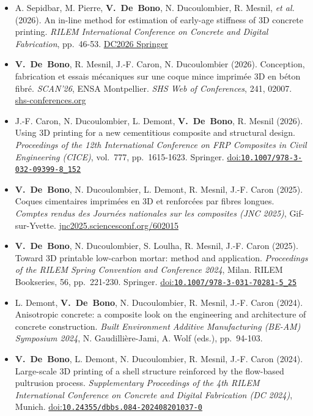 \documentclass[11pt,a4paper]{article}
\newcommand{\doi}[1]{\href{https://doi.org/#1}{doi:\nolinkurl{#1}}}
\newcommand{\me}{\textbf{V.~De~Bono}}
\newenvironment{publis}[1]%
  {\begin{itemize}[label={}, leftmargin=1.2em, labelwidth=0pt, labelsep=0pt,
     itemindent=-1.2em, itemsep=0.45em, topsep=0.3em]}%
  {\end{itemize}}
\begin{document}
\begin{publis}{C}
  \item A. Sepidbar, M. Pierre, \me, N. Ducoulombier, R. Mesnil, \emph{et al.} (2026).
  An in-line method for estimation of early-age stiffness of 3D concrete printing.
  \emph{RILEM International Conference on Concrete and Digital Fabrication}, pp.~46-53.
  \href{https://link.springer.com/chapter/10.1007/978-3-032-36738-9_6}{DC2026 Springer}

  \item \me, R. Mesnil, J.-F. Caron, N. Ducoulombier (2026).
  Conception, fabrication et essais mécaniques sur une coque mince imprimée 3D en béton fibré.
  \emph{SCAN'26}, ENSA Montpellier. \emph{SHS Web of Conferences}, 241, 02007.
  \href{https://www.shs-conferences.org/articles/shsconf/abs/2026/15/shsconf_scan26_02007/shsconf_scan26_02007.html}{shs-conferences.org}

  \item J.-F. Caron, N. Ducoulombier, L. Demont, \me, R. Mesnil (2026).
  Using 3D printing for a new cementitious composite and structural design.
  \emph{Proceedings of the 12th International Conference on FRP Composites in Civil Engineering (CICE)}, vol.~777, pp.~1615-1623. Springer.
  \doi{10.1007/978-3-032-09399-8_152}

  \item \me, N. Ducoulombier, L. Demont, R. Mesnil, J.-F. Caron (2025).
  Coques cimentaires imprimées en 3D et renforcées par fibres longues.
  \emph{Comptes rendus des Journées nationales sur les composites (JNC 2025)}, Gif-sur-Yvette.
  \href{https://jnc2025.sciencesconf.org/602015/document}{jnc2025.sciencesconf.org/602015}

  \item \me, N. Ducoulombier, S. Loulha, R. Mesnil, J.-F. Caron (2025).
  Toward 3D printable low-carbon mortar: method and application.
  \emph{Proceedings of the RILEM Spring Convention and Conference 2024}, Milan. RILEM Bookseries, 56, pp.~221-230. Springer.
  \doi{10.1007/978-3-031-70281-5_25}

  \item L. Demont, \me, N. Ducoulombier, R. Mesnil, J.-F. Caron (2024).
  Anisotropic concrete: a composite look on the engineering and architecture of concrete construction.
  \emph{Built Environment Additive Manufacturing (BE-AM) Symposium 2024}, N. Gaudillière-Jami, A. Wolf (eds.), pp.~94-103.

  \item \me, L. Demont, N. Ducoulombier, R. Mesnil, J.-F. Caron (2024).
  Large-scale 3D printing of a shell structure reinforced by the flow-based pultrusion process.
  \emph{Supplementary Proceedings of the 4th RILEM International Conference on Concrete and Digital Fabrication (DC 2024)}, Munich.
  \doi{10.24355/dbbs.084-202408201037-0}


\end{publis}
\end{document}
